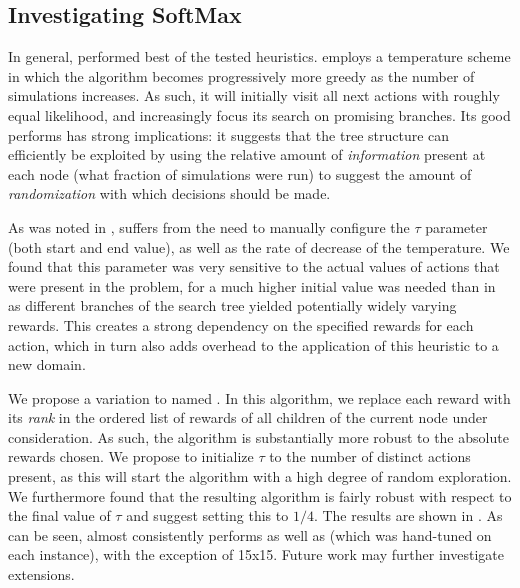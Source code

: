 \subsection{Investigating SoftMax}
In general, \soft performed best of the tested heuristics. \soft employs a temperature scheme in which the algorithm becomes progressively more greedy as the number of simulations increases. As such, it will initially visit all next actions with roughly equal likelihood, and increasingly focus its search on promising branches. Its good performs has strong implications: it suggests that the tree structure can efficiently be exploited by using the relative amount of \emph{information} present at each node (what fraction of simulations were run) to suggest the amount of \emph{randomization} with which decisions should be made.


As was noted in , \soft suffers from the need to manually configure the $\tau$ parameter (both start and end value), as well as the rate of decrease of the temperature. We found that this parameter was very sensitive to the actual values of actions that were present in the problem, \eg for \poc a much higher initial value was needed than in \poc as different branches of the search tree yielded potentially widely varying rewards. This creates a strong dependency on the specified rewards for each action, which in turn also adds overhead to the application of this heuristic to a new domain.

We propose a variation to \soft named \rsoft. In this algorithm, we replace each reward with its \emph{rank} in the ordered list of rewards of all children of the current node under consideration. As such, the algorithm is substantially more robust to the absolute rewards chosen. We propose to initialize $\tau$ to the number of distinct actions present, as this will start the algorithm with a high degree of random exploration. We furthermore found that the resulting algorithm is fairly robust with respect to the final value of $\tau$ and suggest setting this to $1/4$. The results are shown in . As can be seen, \rsoft almost consistently performs as well as \soft (which was hand-tuned on each instance), with the exception of \rock 15x15. Future work may further investigate extensions.


